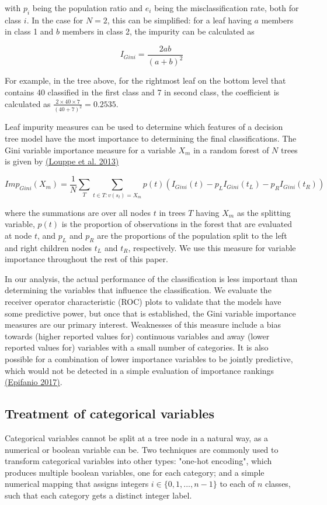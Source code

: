 \documentclass{AISB2008}
\begin{document}
with $p_{i}$ being the population ratio and $e_{i}$ being the misclassification rate, both for class $i$. In the case for $N=2$, this can be simplified: for a leaf having $a$ members in class 1 and $b$ members in class 2, the impurity can be calculated as

$$I_{Gini} = \frac{2 a b}{(a+b)^2}$$

For example, in the tree above, for the rightmost leaf on the bottom level that contains 40 classified in the first class and 7 in second class, the coefficient is calculated as $\frac{2 \times 40 \times 7}{(40+7)^2} = 0.2535$.

Leaf impurity measures can be used to determine which features of a decision tree model have the most importance to determining the final classifications. The Gini variable importance measure for a variable $X_m$ in a random forest of $N$ trees is given by \hyperref[csl:7]{(Louppe et al. 2013)}

$$Imp_{Gini}(X_m) = \frac{1}{N} \sum_T \sum_{t \in{T}: v(s_t)=X_m}{p(t)(I_{Gini}(t)-p_L I_{Gini}(t_L)-p_R I_{Gini}(t_R))}$$

where the summations are over all nodes $t$ in trees $T$ having $X_m$ as the splitting variable, $p(t)$ is the proportion of observations in the forest that are evaluated at node $t$, and $p_L$ and $p_R$ are the proportions of the population split to the left and right children nodes $t_L$ and $t_R$, respectively. We use this measure for variable importance throughout the rest of this paper.

In our analysis, the actual performance of the classification is less important than determining the variables that influence the classification. We evaluate the receiver operator characteristic (ROC) plots to validate that the models have some predictive power, but once that is established, the Gini variable importance measures are our primary interest. Weaknesses of this measure include a bias towards (higher reported values for) continuous variables and away (lower reported values for) variables with a small number of categories. It is also possible for a combination of lower importance variables to be jointly predictive, which would not be detected in a simple evaluation of importance rankings \hyperref[csl:8]{(Epifanio 2017)}.

\subsection{Treatment of categorical variables}
Categorical variables cannot be split at a tree node in a natural way, as a numerical or boolean variable can be. Two techniques are commonly used to transform categorical variables into other types: "one-hot encoding", which produces multiple boolean variables, one for each category; and a simple numerical mapping that assigns integers $i \in \{0, 1, ..., n-1\}$ to each of $n$ classes, such that each category gets a distinct integer label.
\end{document}
